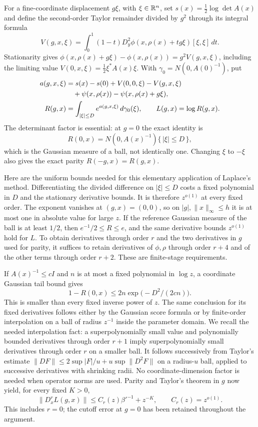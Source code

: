 For a fine-coordinate displacement $g\xi$, with $\xi\in\mathbb R^n$, set
$s(x)=\tfrac12\log\det A(x)$ and define the second-order Taylor remainder
divided by $g^2$ through its integral formula
\[
 V(g,x,\xi)=\int_0^1(1-t)
 D_y^2\phi(x,\rho(x)+tg\xi)[\xi,\xi]\,dt.
\]
Stationarity gives
$\phi(x,\rho(x)+g\xi)-\phi(x,\rho(x))=g^2V(g,x,\xi)$,
including the limiting value
$V(0,x,\xi)=\tfrac12\xi^*A(x)\xi$.
With $\gamma_0=N(0,A(0)^{-1})$, put
\begin{align}
 a(g,x,\xi)&=s(x)-s(0)+V(0,0,\xi)-V(g,x,\xi)\notag\\
 &\quad+\psi(x,\rho(x))-\psi(x,\rho(x)+g\xi),\notag\\
 R(g,x)&=\int_{|\xi|\le D}e^{a(g,x,\xi)}\,d\gamma_0(\xi),
 \qquad L(g,x)=\log R(g,x).
 \label{ch09:truncated-integral}
\end{align}
The determinant factor is essential: at $g=0$ the exact identity is
\[
 R(0,x)=N(0,A(x)^{-1})\{\,|\xi|\le D\,\},
\]
which is the Gaussian measure of a ball, not identically one. Changing $\xi$ to
$-\xi$ also gives the exact parity $R(-g,x)=R(g,x)$.

Here are the uniform bounds needed for this elementary application
of Laplace's method. Differentiating the divided difference on
$|\xi|\le D$ costs a fixed polynomial in $D$ and the stationary
derivative bounds. It is therefore $z^{o(1)}$ at every fixed order.
The exponent vanishes at $(g,x)=(0,0)$, so on
$|g|,\|x\|_\infty\le h$ it is at most one in absolute value for
large $z$. If the reference Gaussian measure of the ball is at least $1/2$, then
$e^{-1}/2\le R\le e$, and the same derivative bounds $z^{o(1)}$ hold
for $L$. To obtain derivatives through order $r$ and the two
derivatives in $g$ used for parity, it suffices to retain derivatives
of $\phi,\rho$ through order $r+4$ and of the other terms through
order $r+2$. These are finite-stage requirements.

If $A(x)^{-1}\le cI$ and $n$ is at most a fixed polynomial in
$\log z$, a coordinate Gaussian tail bound gives
\[
 1-R(0,x)\le 2n\exp\bigl(-D^2/(2cn)\bigr).
\]
This is smaller than every fixed inverse power of $z$.
The same conclusion for its fixed derivatives follows either by
the Gaussian score formula or by finite-order interpolation on a
ball of radius $z^{-1}$ inside the parameter domain. We recall the
needed interpolation fact: a superpolynomially small value and
polynomially bounded derivatives through order $r+1$ imply
superpolynomially small derivatives through order $r$ on a smaller
ball. It follows successively from Taylor's estimate
$\|DF\|\le2\sup|F|/u+u\sup\|D^2F\|$ on a radius-$u$ ball,
applied to successive derivatives with shrinking radii.
No coordinate-dimension factor is needed when operator norms are
used. Parity and Taylor's theorem in $g$ now yield, for every fixed
$K>0$,
\begin{equation}
 \|D_x^r L(g,x)\|\le C_r(z)\beta'^{-1}+z^{-K},
 \qquad C_r(z)=z^{o(1)}.
 \label{ch09:even-gain}
\end{equation}
This includes $r=0$; the cutoff error at $g=0$ has been retained
throughout the argument.

